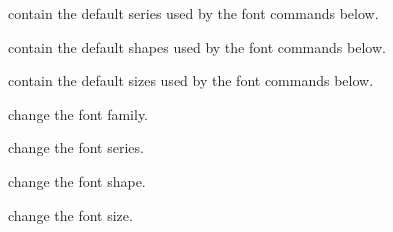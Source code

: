 \begin{code}
  \cs{\FontSeriesMedium}

  \cs{\FontSeriesBold}
\end{code}
contain the default series used by the font commands below.

\begin{code}
  \cs{\FontShapeUpright}

  \cs{\FontShapeItalic}

  \cs{\FontShapeSlanted}

  \cs{\FontShapeSmallCaps}
\end{code}
contain the default shapes used by the font commands below.

\begin{code}
  \cs{\FontSizeTiny}

  \cs{\FontSizeScript}

  \cs{\FontSizeFootnote}

  \cs{\FontSizeSmall}

  \cs{\FontSizeNormal}

  \cs{\FontSizeLargeI}

  \cs{\FontSizeLargeII}

  \cs{\FontSizeLargeIII}

  \cs{\FontSizeHugeI}

  \cs{\FontSizeHugeII}
\end{code}
contain the default sizes used by the font commands below.

\begin{code}
  \cs{\rmfamily}

  \cs{\sffamily}

  \cs{\ttfamily}
\end{code}
change the font family.

\begin{code}
  \cs{\mdseries}

  \cs{\bfseries}
\end{code}
change the font series.

\begin{code}
  \cs{\upshape}

  \cs{\itshape}

  \cs{\slshape}

  \cs{\scshape}
\end{code}
change the font shape.

\begin{code}
  \cs{\tiny}

  \cs{\scriptsize}

  \cs{\footnotesize}

  \cs{\small}

  \cs{\normalsize}

  \cs{\large}

  \cs{\Large}

  \cs{\LARGE}

  \cs{\huge}

  \cs{\Huge}
\end{code}
change the font size.

